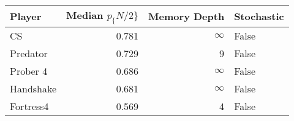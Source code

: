 \begin{tabular}{lrrl}
\toprule
    Player &  Median $p_\{N/2\}$ &  Memory Depth & Stochastic \\
\midrule
        CS &             0.781 &            \(\infty\) &      False \\
  Predator &             0.729 &             9 &      False \\
  Prober 4 &             0.686 &            \(\infty\) &      False \\
 Handshake &             0.681 &            \(\infty\) &      False \\
 Fortress4 &             0.569 &             4 &      False \\
\bottomrule
\end{tabular}
